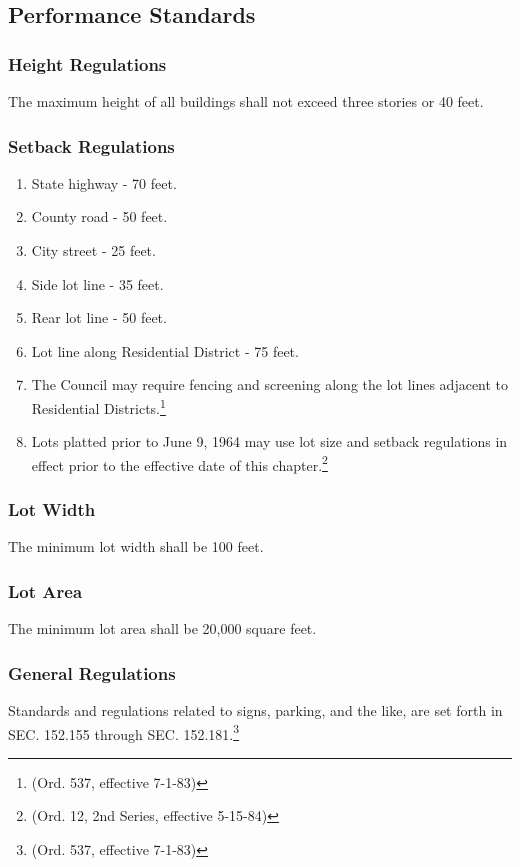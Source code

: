 \subsection{Performance Standards}
\subsubsection{Height Regulations}
The maximum height of all buildings shall not exceed three stories or 40 feet.
\subsubsection{Setback Regulations}
\begin{enumerate}[{\indent}a)]
    \item State highway - 70 feet.
    \item County road - 50 feet.
    \item City street - 25 feet.
    \item Side lot line - 35 feet.
    \item Rear lot line - 50 feet.
    \item Lot line along Residential District - 75 feet.
    \item The Council may require fencing and screening along the lot lines adjacent to Residential Districts.\footnote{(Ord. 537, effective 7-1-83)}
    \item Lots platted prior to June 9, 1964 may use lot size and setback regulations in effect prior to the effective date of this chapter.\footnote{(Ord. 12, 2nd Series, effective 5-15-84)}
\end{enumerate}
\subsubsection{Lot Width}
The minimum lot width shall be 100 feet.
\subsubsection{Lot Area}
The minimum lot area shall be 20,000 square feet.
\subsubsection{General Regulations}
Standards and regulations related to signs, parking, and the like, are set forth in SEC. 152.155 through SEC. 152.181.\footnote{(Ord. 537, effective 7-1-83)}\\


